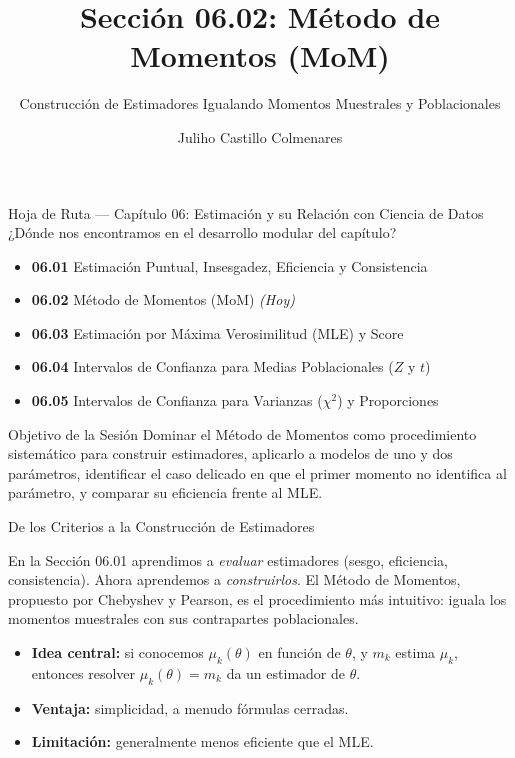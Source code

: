 \documentclass[10pt, aspectratio=169]{beamer}
\title[Método de Momentos]{Sección 06.02: Método de Momentos (MoM)}
\subtitle{Construcción de Estimadores Igualando Momentos Muestrales y Poblacionales}
\author[J. Castillo Colmenares]{Juliho Castillo Colmenares}
\institute{Tecnológico de Monterrey}
\date{\vspace{-1.2cm}}
\begin{document}
\begin{frame}[plain]
  \titlepage
\end{frame}

\begin{frame}{Hoja de Ruta --- Capítulo 06: Estimación y su Relación con Ciencia de Datos}
  \footnotesize
  ¿Dónde nos encontramos en el desarrollo modular del capítulo? \pause
  \begin{itemize}\itemsep=0.08em
    \item \textbf{06.01} Estimación Puntual, Insesgadez, Eficiencia y Consistencia \pause
    \item \textbf{06.02} Método de Momentos (MoM) \emph{(Hoy)} \pause
    \item \textbf{06.03} Estimación por Máxima Verosimilitud (MLE) y Score \pause
    \item \textbf{06.04} Intervalos de Confianza para Medias Poblacionales ($Z$ y $t$) \pause
    \item \textbf{06.05} Intervalos de Confianza para Varianzas ($\chi^2$) y Proporciones
  \end{itemize}
  \vspace{-0.05cm}
  \begin{block}{Objetivo de la Sesión}
    Dominar el Método de Momentos como procedimiento sistemático para construir estimadores, aplicarlo a modelos de uno y dos parámetros, identificar el caso delicado en que el primer momento no identifica al parámetro, y comparar su eficiencia frente al MLE.
  \end{block}
\end{frame}

\begin{frame}{De los Criterios a la Construcción de Estimadores}
  \footnotesize
  \begin{motivacion}
    En la Sección 06.01 aprendimos a \emph{evaluar} estimadores (sesgo, eficiencia, consistencia). Ahora aprendemos a \emph{construirlos}. El Método de Momentos, propuesto por Chebyshev y Pearson, es el procedimiento más intuitivo: iguala los momentos muestrales con sus contrapartes poblacionales.
  \end{motivacion}

  \vspace{0.15cm}
  \pause
  \begin{itemize}\itemsep=0.1cm
    \item \textbf{Idea central:} si conocemos $\mu_k(\theta)$ en función de $\theta$, y $m_k$ estima $\mu_k$, entonces resolver $\mu_k(\theta)=m_k$ da un estimador de $\theta$. \pause
    \item \textbf{Ventaja:} simplicidad, a menudo fórmulas cerradas. \pause
    \item \textbf{Limitación:} generalmente menos eficiente que el MLE.
  \end{itemize}
\end{frame}
\end{document}
